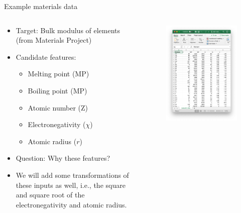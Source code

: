 \documentclass{beamer}
\begin{document}
\begin{frame}{Example materials data}
    \begin{columns}
    \begin{column}{0.6\textwidth}
        \begin{itemize}
            \item Target: Bulk modulus of elements (from Materials Project)
            \item Candidate features:
            \begin{itemize}
                \item Melting point (MP)
                \item Boiling point (MP)
                \item Atomic number (Z)
                \item Electronegativity ($\chi$)
                \item Atomic radius ($r$)
            \end{itemize}
            \item Question: Why these features?
            \item We will add some transformations of these inputs as well, i.e., the square and square root of the electronegativity and atomic radius.
    \end{itemize}
    \end{column}
    \begin{column}{0.4\textwidth}
        \begin{figure}
        \centering
        \includegraphics[width=\textwidth]{figures/elementdata.png}

\end{figure}
\end{column}
\end{columns}
\end{frame}
\end{document}
